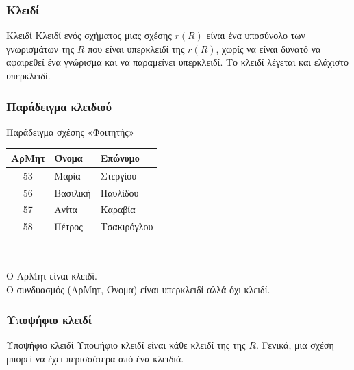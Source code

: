 \begin{frame}[t, fragile]
\frametitle{Κλειδί} 
\begin{minipage}{0.94\textwidth}
  \large
  \begin{block}{Κλειδί}
    {\bb Κλειδί} ενός σχήματος μιας σχέσης $r(R)$ είναι ένα υποσύνολο των γνωρισμάτων της $R$ που είναι
    υπερκλειδί της $r(R)$, χωρίς να είναι δυνατό να αφαιρεθεί ένα γνώρισμα και να παραμείνει υπερκλειδί.
    Το κλειδί λέγεται και ελάχιστο υπερκλειδί. 
  \end{block}
\end{minipage}
\end{frame}


\begin{frame}[t, fragile]
\frametitle{Παράδειγμα κλειδιού}
\begin{minipage}{0.94\textwidth}
  \large
  \begin{exampleblock}{Παράδειγμα σχέσης «Φοιτητής»}
        \begin{tabular}{ c l l } \hline
        {\bf ΑρΜητ}      & {\bf Όνομα} & {\bf Επώνυμο} \\ \hline
        53  &  Μαρία     & Στεργίου  \\
        56  &  Βασιλική  & Παυλίδου  \\
        57  &  Ανίτα     & Καραβία  \\
        58  &  Πέτρος    & Τσακιρόγλου  \\ \hline
      \end{tabular} \\
      \par \bigskip
       Ο ΑρΜητ είναι {\cee κλειδί}. \\
       Ο συνδυασμός  (ΑρΜητ, Όνομα) είναι {\cee υπερκλειδί} αλλά όχι {\cee κλειδί}.
  \end{exampleblock}
\end{minipage}
\end{frame}



\begin{frame}[t, fragile]
\frametitle{Υποψήφιο κλειδί} 
\begin{minipage}{0.94\textwidth}
  \large
  \begin{block}{Υποψήφιο κλειδί}
    {\bb Υποψήφιο κλειδί} είναι κάθε κλειδί της της $R$. Γενικά, μια σχέση μπορεί να έχει περισσότερα 
    από ένα κλειδιά.
  \end{block}
\end{minipage}  
\end{frame}


